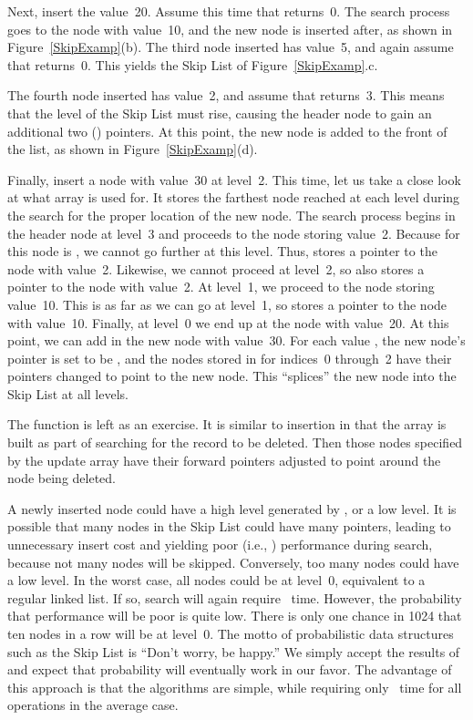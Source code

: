 Next, insert the value~20.
Assume this time that  returns~0.
The search process goes to the node with value~10, and the new node
is inserted after, as shown in Figure~\ref{SkipExamp}(b).
The third node inserted has value~5, and again assume that
 returns~0.
This yields the Skip List of Figure~\ref{SkipExamp}.c.

The fourth node inserted has value~2, and assume that
 returns~3.
This means that the level of the Skip List must rise, causing the
header node to gain an additional two (\NULL) pointers.
At this point, the new node is added to the front of the list, as
shown in Figure~\ref{SkipExamp}(d).

Finally, insert a node with value~30 at level~2.
This time, let us take a close look at what array  is
used for.
It stores the farthest node reached at each level during the search
for the proper location of the new node.
The search process begins in the header node at level~3 and proceeds
to the node storing value~2.
Because  for this node is \NULL, we cannot go further
at this level.
Thus,  stores a pointer to the node with value~2.
Likewise, we cannot proceed at level~2, so  also
stores a pointer to the node with value~2.
At level~1, we proceed to the node storing value~10.
This is as far as we can go at level~1, so  stores a
pointer to the node with value~10.
Finally, at level~0 we end up at the node with value~20.
At this point, we can add in the new node with value~30.
For each value , the new node's  pointer is
set to be , and
the nodes stored in  for indices~0 through~2 have
their  pointers changed to point to the new node.
This ``splices'' the new node into the Skip List at all levels.

The  function is left as an exercise.
It is similar to insertion in that the  array is built
as part of searching for the record to be deleted.
Then those nodes
specified by the update array have their forward pointers adjusted to
point around the node being deleted.

A newly inserted node could have a high level generated by
, or a low level.
It is possible that many nodes in the Skip List could have many
pointers, leading to unnecessary insert cost and yielding poor
(i.e., \Thetan) performance during search, because not many nodes will
be skipped.
Conversely, too many nodes could have a low level.
In the worst case, all nodes could be at level~0, equivalent to a
regular linked list.
If so, search will again require \Thetan\ time.
However, the probability that performance will be poor is quite low.
There is only one chance in 1024 that ten nodes in a row will be at
level~0.
The motto of probabilistic data structures such as the Skip List is
``Don't worry, be happy.''
We simply accept the results of  and expect that
probability will eventually work in our favor.
The advantage of this approach is that the algorithms are simple,
while requiring only \Thetalogn\ time for all operations in the
average case.

